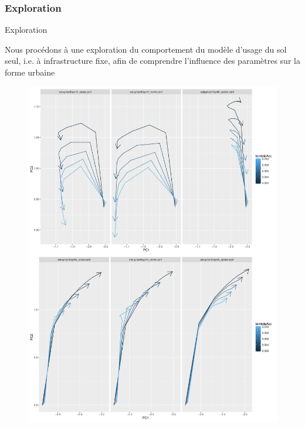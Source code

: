\subsubsection{Exploration}{Exploration}


Nous procédons à une exploration du comportement du modèle d'usage du sol seul, i.e. à infrastructure fixe, afin de comprendre l'influence des paramètres sur la forme urbaine






\begin{figure}
	\includegraphics[width=\linewidth]{Figures/Final/A-lutecia-morphotrajs.jpg}
\end{figure}



